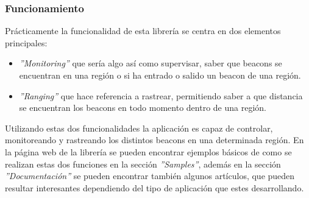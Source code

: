 \subsubsection{Funcionamiento}

Prácticamente la funcionalidad de esta librería se centra en dos elementos principales: 

\begin{itemize}
\item \textit{''Monitoring''} que sería algo así como supervisar, saber que beacons se encuentran en una región o si ha entrado o salido un beacon de una región.
\item \textit{''Ranging''} que hace referencia a rastrear, permitiendo saber a que distancia se encuentran los beacons en todo momento dentro de una región.
\end{itemize}

Utilizando estas dos funcionalidades la aplicación es capaz de controlar, monitoreando y rastreando los distintos beacons en una determinada región. En la página web de la librería se pueden encontrar ejemplos básicos\cite{URL::altbeaconSamples} de como se realizan estas dos funciones en la sección \textit{''Samples''}, además en la sección \textit{''Documentación''} se pueden encontrar también algunos artículos, que pueden resultar interesantes dependiendo del tipo de aplicación que estes desarrollando.




